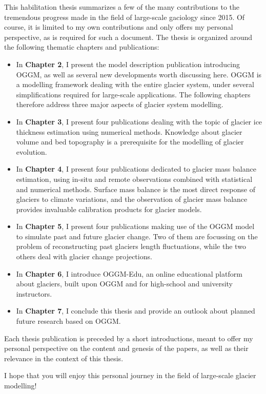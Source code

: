 This habilitation thesis summarizes a few of the many contributions to the tremendous progress made in the field of
large-scale gaciology since 2015. Of course, it is limited to my own contributions and only offers my personal perspective,
as is required for such a document. The thesis is organized around the following thematic chapters and publications:
\begin{itemize}
\item {} 
In \textbf{Chapter 2}, I present the model description publication introducing OGGM, as well as several new developments
worth discussing here. OGGM is a modelling framework dealing with the entire glacier system, under several
simplifications required for large-scale applications. The following chapters therefore address three major aspects of
glacier system modelling.

\item {} 
In \textbf{Chapter 3}, I present four publications dealing with the topic of glacier ice thickness estimation using
numerical methods. Knowledge about glacier volume and bed topography is a prerequisite for the modelling of glacier
evolution.

\item {} 
In \textbf{Chapter 4}, I present four publications dedicated to glacier mass balance estimation, using in-situ and remote
observations combined with statistical and numerical methods. Surface mass balance is the most direct response of
glaciers to climate variations, and the observation of glacier mass balance provides invaluable calibration products
for glacier models.

\item {} 
In \textbf{Chapter 5}, I present four publications making use of the OGGM model to simulate past and future glacier change.
Two of them are focussing on the problem of reconstructing past glaciers length fluctuations, while the two others
deal with glacier change projections.

\item {} 
In \textbf{Chapter 6}, I introduce OGGM-Edu, an online educational platform about glaciers, built upon OGGM and for
high-school and university instructors.

\item {} 
In \textbf{Chapter 7}, I conclude this thesis and provide an outlook about planned future research based on OGGM.

\end{itemize}

Each thesis publication is preceded by a short introductions, meant to offer my personal
perspective on the content and genesis of the papers, as well as their relevance in the context
of this thesis.

I hope that you will enjoy this personal journey in the field of large-scale glacier modelling!
